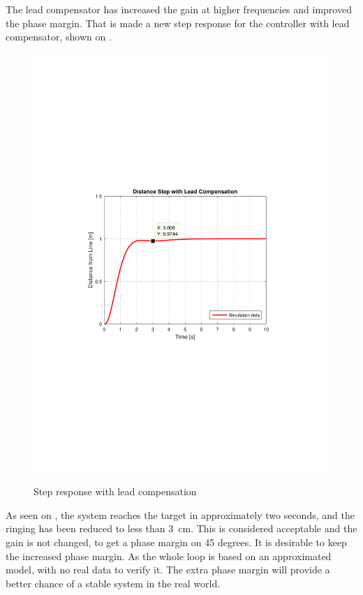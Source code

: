 The lead compensator has increased the gain at higher frequencies and improved the phase margin. That is made a new step response for the controller with lead compensator, shown on .

\begin{figure}[H]
  \centering
  {
    \includegraphics[width=1.4\textwidth]{figures/distanceStep3.pdf}
  }
  \caption{Step response with lead compensation}
  \label{SimulationSteeringP3}
\end{figure}\vspace{-5mm}
As seen on , the system reaches the target in approximately two seconds, and the ringing has been reduced to less than \SI{3}{cm}. This is considered acceptable and the gain is not changed, to get a phase margin on 45 degrees. It is desirable to keep the increased phase margin. As the whole loop is based on an approximated model, with no real data to verify it. The extra phase margin will provide a better chance of a stable system in the real world.